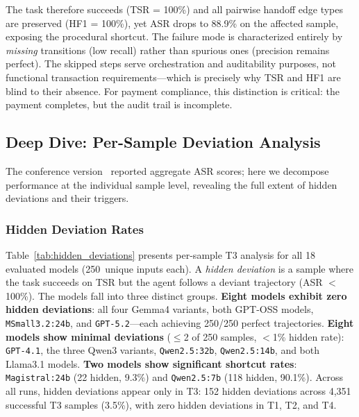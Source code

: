 The task therefore succeeds (TSR = 100\%) and all pairwise handoff edge types are preserved (HF1 = 100\%), yet ASR drops to 88.9\% on the affected sample, exposing the procedural shortcut. The failure mode is characterized entirely by \textit{missing} transitions (low recall) rather than spurious ones (precision remains perfect). The skipped steps serve orchestration and auditability purposes, not functional transaction requirements---which is precisely why TSR and HF1 are blind to their absence. For payment compliance, this distinction is critical: the payment completes, but the audit trail is incomplete.

\subsection{Deep Dive: Per-Sample Deviation Analysis}

The conference version~\cite{huang2026asr} reported aggregate ASR scores; here we decompose performance at the individual sample level, revealing the full extent of hidden deviations and their triggers.

\subsubsection{Hidden Deviation Rates}

Table~\ref{tab:hidden_deviations} presents per-sample T3 analysis for all 18 evaluated models (250~unique inputs each). A \textit{hidden deviation} is a sample where the task succeeds on TSR but the agent follows a deviant trajectory (ASR $<$ 100\%). The models fall into three distinct groups. \textbf{Eight models exhibit zero hidden deviations}: all four Gemma4 variants, both GPT-OSS models, \texttt{MSmall3.2:24b}, and \texttt{GPT-5.2}---each achieving 250/250 perfect trajectories. \textbf{Eight models show minimal deviations} ($\leq$2 of 250 samples, $<$1\% hidden rate): \texttt{GPT-4.1}, the three Qwen3 variants, \texttt{Qwen2.5:32b}, \texttt{Qwen2.5:14b}, and both Llama3.1 models. \textbf{Two models show significant shortcut rates}: \texttt{Magistral:24b} (22 hidden, 9.3\%) and \texttt{Qwen2.5:7b} (118 hidden, 90.1\%). Across all runs, hidden deviations appear only in T3: 152 hidden deviations across 4{,}351 successful T3 samples (3.5\%), with zero hidden deviations in T1, T2, and T4.

